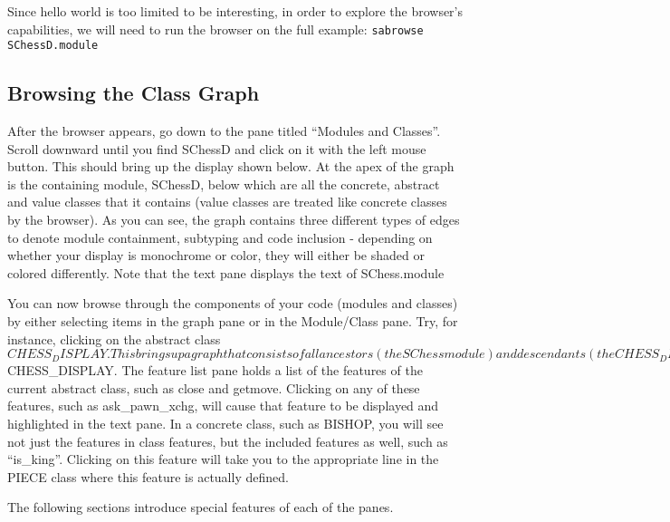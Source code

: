 	Since hello world is too limited to be interesting, in order
to explore the browser's capabilities, we will need to run the browser
on the full example:
\tt{sabrowse SChessD.module}

\subsection{Browsing the Class Graph}
	After the browser appears, go down to the pane titled
``Modules and Classes''. Scroll downward until you find SChessD and
click on it with the left mouse button. This should bring up the
display shown below.  At the apex of the graph is the containing
module, SChessD, below which are all the concrete, abstract and value
classes that it contains (value classes are treated like concrete classes 
by the browser). As you can see, the graph contains three
different types of edges to denote module containment, subtyping and
code inclusion - depending on whether your display is monochrome or
color, they will either be shaded or colored differently. Note that
the text pane displays the text of SChess.module

	You can now browse through the components of your code
(modules and classes) by either selecting items in the graph pane or
in the Module/Class pane.  Try, for instance, clicking on the abstract
class $CHESS_DISPLAY. This brings up a graph that consists of all
ancestors (the SChess module) and descendants (the CHESS_DISPLAY and
ASCII_DISPLAY classes) of $CHESS_DISPLAY.  The feature list pane holds
a list of the features of the current abstract class, such as close
and getmove.  Clicking on any of these features, such as
ask_pawn_xchg, will cause that feature to be displayed and highlighted
in the text pane. In a concrete class, such as BISHOP, you will see
not just the features in class features, but the included features as
well, such as ``is_king''. Clicking on this feature will take you to
the appropriate line in the PIECE class where this feature is actually
defined.

	The following sections introduce special features of each of
the panes.

